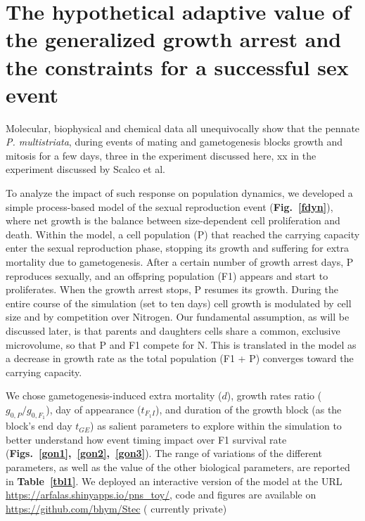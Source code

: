 \documentclass[a4paper,oneside]{book}
\begin{document}
  \section*{The hypothetical adaptive value of the generalized growth arrest and the constraints for a successful sex event}
    Molecular, biophysical and chemical data all unequivocally show that the pennate \textit{P. multistriata}, during events of mating and gametogenesis blocks growth and mitosis for a few days, three in the experiment discussed here, xx in the experiment discussed by Scalco et al.

    To analyze the impact of such response on population dynamics, we developed a simple process-based model of the sexual reproduction event (\textbf{Fig.~\ref{fdyn}}), where net growth is the balance between size-dependent cell proliferation and death.
    Within the model, a cell population (P) that reached the carrying capacity enter the sexual reproduction phase, stopping its growth and suffering for extra mortality due to gametogenesis.
    After a certain number of growth arrest days, P reproduces sexually, and an offspring population (F1) appears and start to proliferates.
    When the growth arrest stops, P resumes its growth.
    During the entire course of the simulation (set to ten days) cell growth is modulated by cell size and by competition over Nitrogen.
    Our fundamental assumption, as will be discussed later, is that parents and daughters cells share a common, exclusive microvolume, so that P and F1 compete for N. This is translated in the model as a decrease in growth rate as the total population (F1 + P) converges toward the carrying capacity.

    We chose gametogenesis-induced extra mortality ($d$), growth rates ratio ($g_{0,P}/g_{0,F_{1}}$), day of appearance ($t_{F_{1}I}$), and duration of the growth block (as the block's end day $t_{GE}$) as salient parameters to explore within the simulation to better understand how event timing impact over F1 survival rate (\textbf{Figs.~\ref{gon1},~\ref{gon2},~\ref{gon3}}).
    The range of variations of the different parameters, as well as the value of the other biological parameters, are reported in \textbf{Table~\ref{tbl1}}.
    We deployed an interactive version of the model at the URL \url{https://arfalas.shinyapps.io/pns_toy/}, code and figures are available on \url{https://github.com/bhym/Stec} ({\color{red} currently private})
\end{document}
